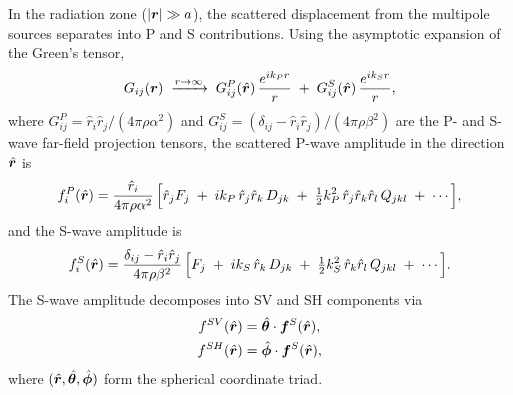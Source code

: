 In the radiation zone ($|\bm{r}| \gg a$), the scattered displacement
from the multipole sources separates into P and S contributions.
Using the asymptotic expansion of the Green's tensor,
\begin{equation}
  G_{ij}(\bm{r}) \;\xrightarrow{r\to\infty}\;
  G^P_{ij}(\hat{\bm{r}})\,\frac{e^{ik_P r}}{r}
  \;+\; G^S_{ij}(\hat{\bm{r}})\,\frac{e^{ik_S r}}{r},
  \label{eq:G-farfield}
\end{equation}
where $G^P_{ij} = \hat{r}_i\hat{r}_j/(4\pi\rho\alpha^2)$ and
$G^S_{ij} = (\delta_{ij} - \hat{r}_i\hat{r}_j)/(4\pi\rho\beta^2)$
are the P- and S-wave far-field projection tensors, the scattered
P-wave amplitude in the direction $\hat{\bm{r}}$ is
\begin{equation}
  f^P_i(\hat{\bm{r}})
  = \frac{\hat{r}_i}{4\pi\rho\alpha^2}\,
    \Bigl[\hat{r}_j F_j
    \;+\; ik_P\,\hat{r}_j\hat{r}_k\,D_{jk}
    \;+\; \tfrac{1}{2}k_P^2\,\hat{r}_j\hat{r}_k\hat{r}_l\,Q_{jkl}
    \;+\; \cdots
    \Bigr],
  \label{eq:fP}
\end{equation}
and the S-wave amplitude is
\begin{equation}
  f^S_i(\hat{\bm{r}})
  = \frac{\delta_{ij} - \hat{r}_i\hat{r}_j}{4\pi\rho\beta^2}\,
    \Bigl[F_j
    \;+\; ik_S\,\hat{r}_k\,D_{jk}
    \;+\; \tfrac{1}{2}k_S^2\,\hat{r}_k\hat{r}_l\,Q_{jkl}
    \;+\; \cdots
    \Bigr].
  \label{eq:fS}
\end{equation}
The S-wave amplitude decomposes into SV and SH components via
\begin{align}
  f^{SV}(\hat{\bm{r}}) &= \hat{\bm{\theta}} \cdot \bm{f}^S(\hat{\bm{r}}),
  \label{eq:fSV}\\
  f^{SH}(\hat{\bm{r}}) &= \hat{\bm{\phi}} \cdot \bm{f}^S(\hat{\bm{r}}),
  \label{eq:fSH}
\end{align}
where $(\hat{\bm{r}},\hat{\bm{\theta}},\hat{\bm{\phi}})$ form the
spherical coordinate triad.

